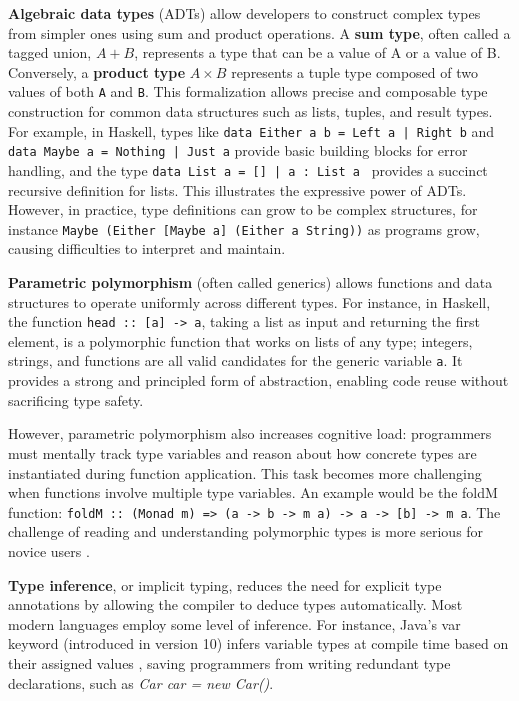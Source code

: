 \documentclass[preprint,12pt]{elsarticle}
\begin{document}
{\bf Algebraic data types} (ADTs) \cite{Milner1978-qz} allow developers to construct complex types from simpler ones using sum and product operations. A {\bf sum type}, often called a tagged union, $A + B$, represents a type that can be a value of A or a value of B. Conversely, a {\bf product type} $A \times B$ represents a tuple type composed of two values of both {\tt A} and {\tt B}. This formalization allows precise and composable type construction for common data structures such as lists, tuples, and result types.
For example, in Haskell, types like \texttt{data Either a b = Left a | Right b} and \texttt{data Maybe a = Nothing | Just a} provide basic building blocks for error handling, and the type \texttt{data List a = [] | a : List a } provides a succinct recursive definition for lists. This illustrates the expressive power of ADTs. However, in practice, type definitions can grow to be complex structures, for instance \texttt {Maybe (Either [Maybe a] (Either a String))} as programs grow, causing difficulties to interpret and maintain. 


{\bf Parametric polymorphism} (often called generics) allows functions and data structures to operate uniformly across different types. For instance, in Haskell, the function \texttt{head :: [a] -> a}, taking a list as input and returning the first element, is a polymorphic function that works on lists of any type; integers, strings, and functions are all valid candidates for the generic variable \texttt{a}.  It provides a strong and principled form of abstraction, enabling code reuse without sacrificing type safety.

However, parametric polymorphism also increases cognitive load: programmers must mentally track type variables and reason about how concrete types are instantiated during function application. This task becomes more challenging when functions involve multiple type variables. An example would be the foldM function: \texttt{foldM :: (Monad m) => (a -> b -> m a) -> a -> [b] -> m a}. The challenge of reading and understanding polymorphic types is more serious for novice users \cite{Jun2000-ec, Jun2000-yu}.



{\bf Type inference}, or implicit typing, reduces the need for explicit type annotations by allowing the compiler to deduce types automatically.
Most modern languages employ some level of inference. For instance, Java’s var keyword (introduced in version 10) infers variable types at compile time based on their assigned values \cite{Java-Developers2023-sp}, saving programmers from writing redundant type declarations, such as \textit {Car car = new Car()}.
\end{document}
